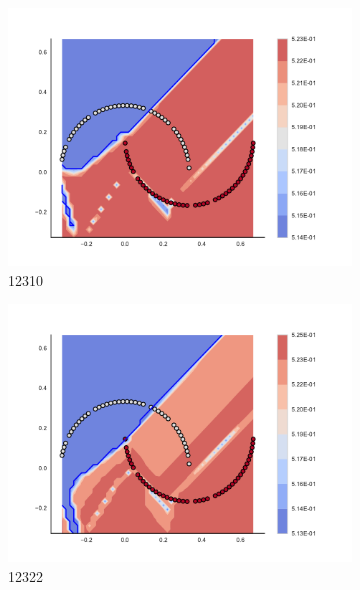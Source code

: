 \begin{figure}[h]
\begin{subfigure}[b]{0.09\textwidth}
    \includegraphics[clip, trim=2.35cm 1.75cm 4.5cm 0cm,width=\textwidth]{img/convergence/12310.pdf}
    \caption{12310}
    \label{fig:convergence_12310}
\end{subfigure}
%
\begin{subfigure}[b]{0.09\textwidth}
    \includegraphics[clip, trim=2.35cm 1.75cm 4.5cm 0cm,width=\textwidth]{img/convergence/12322.pdf}
    \caption{12322}
    \label{fig:convergence_12322}
\end{subfigure}
%
\begin{subfigure}[b]{0.09\textwidth}

\end{subfigure}
\end{figure}
